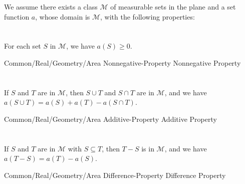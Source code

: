 \documentclass{article}
\newcommand{\link}[2]{\lean{../..}
  {Common/Real/Geometry/Area} %
  {#1} %
  {#2} %
}
\begin{document}

We assume there exists a class $\mathscr{M}$ of measurable sets in the plane and
  a set function $a$, whose domain is $\mathscr{M}$, with the following
  properties:

\section*{}%
%

For each set $S$ in $\mathscr{M}$, we have $a(S) \geq 0$.

\begin{axiom}

  \link{Nonnegative-Property}{Nonnegative Property}

\end{axiom}

\section*{}%
%

If $S$ and $T$ are in $\mathscr{M}$, then $S \cup T$ and $S \cap T$ are in
  $\mathscr{M}$, and we have $a(S \cup T) = a(S) + a(T) - a(S \cap T)$.

\begin{axiom}

  \link{Additive-Property}{Additive Property}

\end{axiom}

\section*{}%
%

If $S$ and $T$ are in $\mathscr{M}$ with $S \subseteq T$, then $T - S$ is in
  $\mathscr{M}$, and we have $a(T - S) = a(T) - a(S)$.

\begin{axiom}

  \link{Difference-Property}{Difference Property}

\end{axiom}

\section*{}%
%
\end{document}
